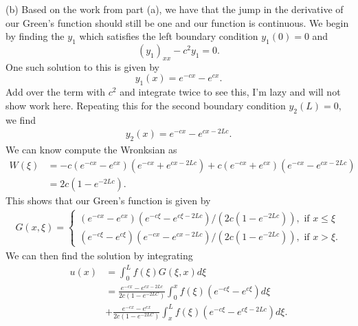 \documentclass[12pt]{article}
\theoremstyle{definition}
\theoremstyle{remark}
\begin{document}
(b) Based on the work from part (a), we have that the jump in the derivative of our Green's function should still be one and our function is continuous. We begin by finding the $y_{1}$ which satisfies the left boundary condition $y_{1}(0) = 0$ and \begin{equation*}
    (y_{1})_{xx} - c^{2} y_{1} = 0.
\end{equation*}
One such solution to this is given by
\begin{equation*}
    y_{1}(x) = e^{-cx} - e^{cx}. 
\end{equation*}
Add over the term with $c^{2}$ and integrate twice to see this, I'm lazy and will not show work here. Repeating this for the second boundary condition $y_{2}(L) = 0$, we find
\begin{align*}
    y_{2}(x) = e^{-cx} - e^{cx - 2Lc}.
\end{align*}
We can know compute the Wronksian as 
\begin{align*}
    W(\xi) &= -c(e^{-cx} - e^{cx})(e^{-cx} + e^{cx-2Lc}) +  c(e^{-cx} + e^{cx})(e^{-cx} - e^{cx-2Lc})\\
           &= 2c( 1 - e^{-2Lc}).
\end{align*}
This shows that our Green's function is given by
\begin{align*}
    G(x, \xi) = 
\begin{cases}
    (e^{-cx} - e^{cx})(e^{-c\xi} - e^{c\xi - 2Lc}) / (2c(1 - e^{-2Lc})), \text{ if } x \leq \xi\\
    (e^{-c\xi} - e^{c\xi})(e^{-cx} - e^{cx - 2Lc}) / (2c(1 - e^{-2Lc})), \text{ if } x > \xi.
\end{cases}
\end{align*}
We can then find the solution by integrating
\begin{align*}
    u(x) &= \int_{0}^{L} f(\xi) G(\xi, x)d\xi \\
         &= \frac{e^{-cx} - e^{cx - 2Lc}}{2c(1 - e^{-2LC})}\int_{0}^{x} f(\xi) (e^{-c\xi} - e^{c\xi}) d\xi\\
         &+ \frac{e^{-cx} - e^{cx}}{2c(1 - e^{-2LC})} \int_{x}^{L} f(\xi) (e^{-c\xi} - e^{c\xi - 2Lc}) d\xi.
\end{align*}
\newpage
\end{document}

